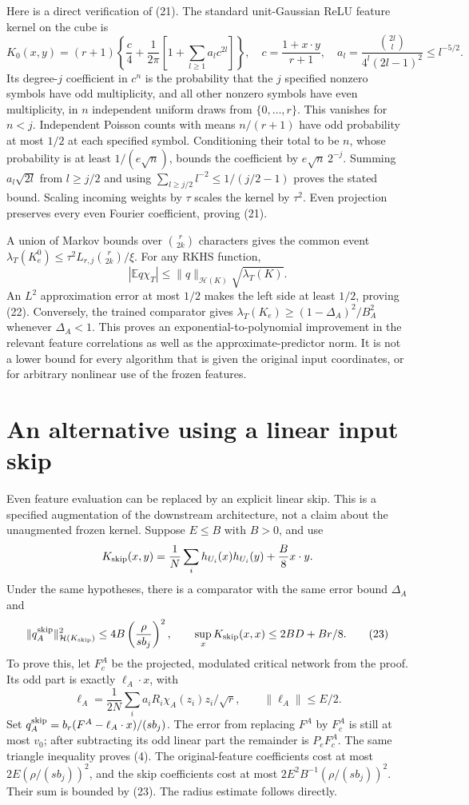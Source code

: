 \documentclass[11pt]{article}
\newcommand{\E}{\mathbb E}\newcommand{\R}{\mathbb R}
\begin{document}
Here is a direct verification of (21). The standard unit-Gaussian ReLU
feature kernel on the cube is
\[
 K_0(x,y)=(r+1)\left\{\frac c4+
 \frac1{2\pi}\left[1+\sum_{l\ge1}a_lc^{2l}\right]\right\},
 \quad c=\frac{1+x\cdot y}{r+1},\quad
 a_l=\frac{\binom{2l}{l}}{4^l(2l-1)^2}\le l^{-5/2}.
\]
Its degree-$j$ coefficient in $c^n$ is the probability that the $j$
specified nonzero symbols have odd multiplicity, and all other nonzero
symbols have even multiplicity, in $n$ independent uniform draws from
$\{0,\ldots,r\}$. This vanishes for $n<j$. Independent Poisson counts
with means $n/(r+1)$ have odd probability at most $1/2$ at each specified
symbol. Conditioning their total to be $n$, whose probability is at
least $1/(e\sqrt n)$, bounds the coefficient by $e\sqrt n\,2^{-j}$.
Summing $a_l\sqrt{2l}$ from $l\ge j/2$ and using
$\sum_{l\ge j/2}l^{-2}\le1/(j/2-1)$ proves the stated bound.
Scaling incoming weights by $\tau$ scales the kernel by $\tau^2$.
Even projection preserves every even Fourier coefficient, proving (21).

A union of Markov bounds over $\binom r{2k}$ characters gives the common
event $\lambda_T(K_e^0)\le\tau^2L_{r,j}\binom r{2k}/\xi$.
For any RKHS function,
\[
 |\E q\chi_T|\le\|q\|_{\mathcal H(K)}\sqrt{\lambda_T(K)}.
\]
An $L^2$ approximation error at most $1/2$ makes the left side at least
$1/2$, proving (22). Conversely, the trained comparator gives
$\lambda_T(K_e)\ge(1-\Delta_A)^2/B_A^2$ whenever $\Delta_A<1$.
This proves an exponential-to-polynomial improvement in the relevant
feature correlations as well as the approximate-predictor norm.
It is not a lower bound for every algorithm that is given the original
input coordinates, or for arbitrary nonlinear use of the frozen features.


\section{An alternative using a linear input skip}
Even feature evaluation can be replaced by an explicit linear skip.
This is a specified augmentation of the downstream architecture, not a
claim about the unaugmented frozen kernel. Suppose $E\le B$ with
$B>0$, and use
\[
 K_{\rm skip}(x,y)=\frac1N\sum_i h_{U_i}(x)h_{U_i}(y)
                                      +\frac B8 x\cdot y.
\]
Under the same hypotheses, there is a comparator with the same error
bound $\Delta_A$ and
\[
 \|q_A^{\rm skip}\|_{\mathcal H(K_{\rm skip})}^2
       \le4B\left(\frac{\rho}{s b_j}\right)^2,
 \qquad \sup_xK_{\rm skip}(x,x)\le2BD+Br/8.
 \tag{23}
\]
To prove this, let $F_c^A$ be the projected, modulated critical network
from the proof. Its odd part is exactly $\ell_A\cdot x$, with
\[
 \ell_A=\frac1{2N}\sum_i a_iR_i\chi_A(z_i)z_i/\sqrt r,
 \qquad \|\ell_A\|\le E/2.
\]
Set $q_A^{\rm skip}=b_r(F^A-\ell_A\cdot x)/(s b_j)$.
The error from replacing $F^A$ by $F_c^A$ is still at most $v_0$;
after subtracting its odd linear part the remainder is $P_eF_c^A$.
The same triangle inequality proves (4). The original-feature
coefficients cost at most $2E(\rho/(s b_j))^2$, and the skip
coefficients cost at most
$2E^2B^{-1}(\rho/(s b_j))^2$. Their sum is bounded by (23).
The radius estimate follows directly.
\end{document}
